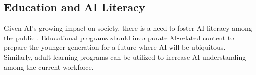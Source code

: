 \documentclass[man]{apa7}
\begin{document}
\subsection{Education and AI Literacy}
Given AI's growing impact on society, there is a need to foster AI literacy among the public \parencite{long2019}. Educational programs should incorporate AI-related content to prepare the younger generation for a future where AI will be ubiquitous. Similarly, adult learning programs can be utilized to increase AI understanding among the current workforce.

\printbibliography
\end{document}

